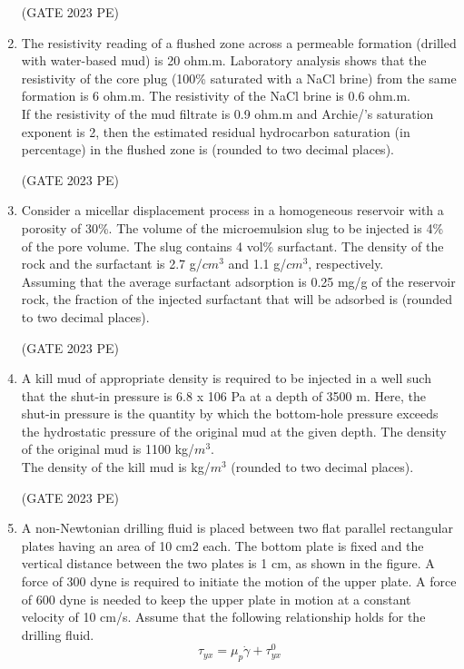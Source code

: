 \documentclass[journal,12pt,onecolumn]{exam}
\theoremstyle{remark}
\begin{document}
\begin{enumerate}
\hfill{(GATE 2023 PE)}
\item The resistivity reading of a flushed zone across a permeable formation (drilled
with water-based mud) is 20 ohm.m. Laboratory analysis shows that the resistivity
of the core plug (100\% saturated with a NaCl brine) from the same formation is
6 ohm.m. The resistivity of the NaCl brine is 0.6 ohm.m.\\
If the resistivity of the mud filtrate is 0.9 ohm.m and Archie/'s saturation exponent is
2, then the estimated residual hydrocarbon saturation (in percentage) in the
flushed zone is \underline{\hspace{2cm}}  (rounded to two decimal places).

\hfill{(GATE 2023 PE)}
\item Consider a micellar displacement process in a homogeneous reservoir with a
porosity of 30\%. The volume of the microemulsion slug to be injected is 4\% of
the pore volume. The slug contains 4 vol\% surfactant. The density of the rock and
the surfactant is 2.7 g/$cm^3$ and 1.1 g/$cm^3$, respectively.\\
Assuming that the average surfactant adsorption is 0.25 mg/g of the reservoir rock,
the fraction of the injected surfactant that will be adsorbed is \underline{\hspace{2cm}} 
(rounded to two decimal places).

\hfill{(GATE 2023 PE)}
\item A kill mud of appropriate density is required to be injected in a well such that the
shut-in pressure is 6.8 x 106 Pa at a depth of 3500 m. Here, the shut-in pressure is
the quantity by which the bottom-hole pressure exceeds the hydrostatic pressure
of the original mud at the given depth. The density of the original mud is
1100 kg/$m^3$.\\
The density of the kill mud is  \underline{\hspace{2cm}}  kg/$m^3$ (rounded to two decimal places).

\hfill{(GATE 2023 PE)}
\item A non-Newtonian drilling fluid is placed between two flat parallel rectangular
plates having an area of 10 cm2 each. The bottom plate is fixed and the vertical
distance between the two plates is 1 cm, as shown in the figure. A force of 300
dyne is required to initiate the motion of the upper plate. A force of 600 dyne is
needed to keep the upper plate in motion at a constant velocity of 10 cm/s. Assume
that the following relationship holds for the drilling fluid.
\[
\tau_{yx} = \mu_p \dot{\gamma} + \tau_{yx}^0
\]


\end{enumerate}
\end{document}
